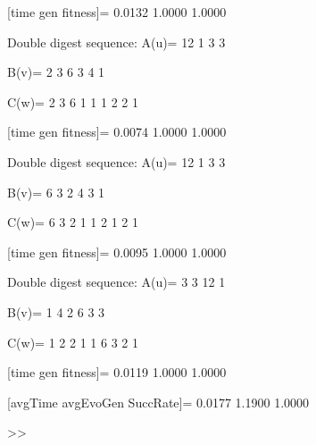 [time gen fitness]=
    0.0132    1.0000    1.0000

Double digest sequence:
A(u)=
    12     1     3     3

B(v)=
     2     3     6     3     4     1

C(w)=
     2     3     6     1     1     1     2     2     1

[time gen fitness]=
    0.0074    1.0000    1.0000

Double digest sequence:
A(u)=
    12     1     3     3

B(v)=
     6     3     2     4     3     1

C(w)=
     6     3     2     1     1     2     1     2     1

[time gen fitness]=
    0.0095    1.0000    1.0000

Double digest sequence:
A(u)=
     3     3    12     1

B(v)=
     1     4     2     6     3     3

C(w)=
     1     2     2     1     1     6     3     2     1

[time gen fitness]=
    0.0119    1.0000    1.0000

[avgTime  avgEvoGen  SuccRate]=
    0.0177    1.1900    1.0000

>> 